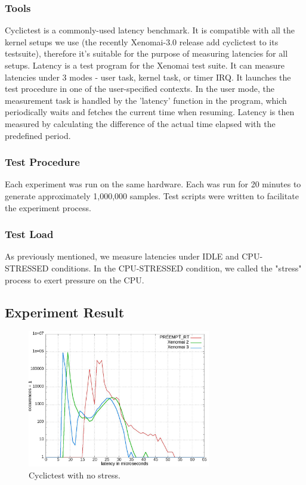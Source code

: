 \documentclass[10pt,a4paper]{article}
\begin{document}
\begin{multicols}{2}
\subsubsection{Tools}
Cyclictest is a commonly-used latency benchmark. It is compatible with all the kernel setups we use (the recently Xenomai-3.0 release add cyclictest to its testsuite), therefore it's suitable for the purpose of measuring latencies for all setups.
Latency is a test program for the Xenomai test suite. It can measure latencies under 3 modes - user task, kernel task, or timer IRQ. It launches the test procedure in one of the user-specified contexts. In the user mode, the measurement task is handled by the 'latency' function in the program, which periodically waits and fetches the current time when resuming. Latency is then measured by calculating the difference of the actual time elapsed with the predefined period.
\subsubsection{Test Procedure}
Each experiment was run on the same hardware. Each was run for 20 minutes to generate approximately 1,000,000 samples. Test scripts were written to facilitate the experiment process.
\subsubsection{Test Load}
As previously mentioned, we measure latencies under IDLE and CPU-STRESSED conditions. In the CPU-STRESSED condition, we called the "stress" process to exert pressure on the CPU.
\subsection{Experiment Result}
\begin{figure}[H]
\begin{center}
\includegraphics[width=8cm]{img/cyclictest_idle.jpg}
\caption{Cyclictest with no stress.}
\label{cyclictest-idle}
\end{center}
\end{figure}


\end{multicols}
\end{document}
